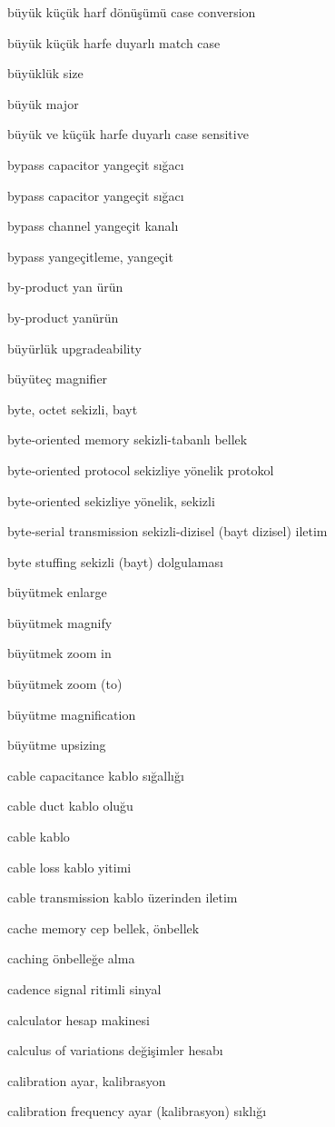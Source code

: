 \documentclass[12pt,fleqn]{article}\usepackage{../../common}
\begin{document}
büyük küçük harf dönüşümü case conversion

büyük küçük harfe duyarlı match case

büyüklük size

büyük major

büyük ve küçük harfe duyarlı case sensitive

bypass capacitor yangeçit sığacı

bypass capacitor yangeçit sığacı

bypass channel yangeçit kanalı

bypass yangeçitleme, yangeçit

by-product yan ürün

by-product yanürün

büyürlük upgradeability

büyüteç magnifier

byte, octet sekizli, bayt

byte-oriented memory sekizli-tabanlı bellek

byte-oriented protocol sekizliye yönelik protokol

byte-oriented sekizliye yönelik, sekizli

byte-serial transmission sekizli-dizisel (bayt dizisel) iletim

byte stuffing sekizli (bayt) dolgulaması

büyütmek enlarge

büyütmek magnify

büyütmek zoom in

büyütmek zoom (to)

büyütme magnification

büyütme upsizing

cable capacitance kablo sığallığı

cable duct kablo oluğu

cable kablo

cable loss kablo yitimi

cable transmission kablo üzerinden iletim

cache memory cep bellek, önbellek

caching önbelleğe alma

cadence signal ritimli sinyal

calculator hesap makinesi

calculus of variations değişimler hesabı

calibration ayar, kalibrasyon

calibration frequency ayar (kalibrasyon) sıklığı
\end{document}
